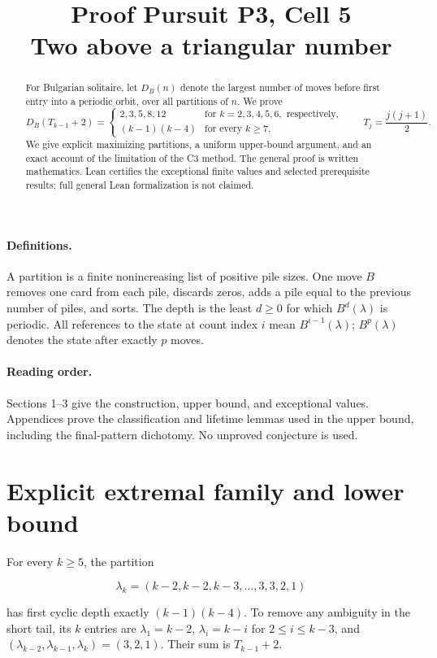 \documentclass[11pt,a4paper]{article}
\title{Proof Pursuit P3, Cell 5\\Two above a triangular number}
\author{}
\date{}
\begin{document}
\maketitle
\begin{abstract}
For Bulgarian solitaire, let $D_B(n)$ denote the largest number of moves before first entry into a periodic orbit, over all partitions of $n$. We prove
\[
D_B(T_{k-1}+2)=
\begin{cases}
2,3,5,8,12 & \text{for } k=2,3,4,5,6,\text{ respectively},\\
(k-1)(k-4) & \text{for every }k\ge7,
\end{cases}
\qquad T_j=\frac{j(j+1)}2.
\]
We give explicit maximizing partitions, a uniform upper-bound argument, and an exact account of the limitation of the C3 method. The general proof is written mathematics. Lean certifies the exceptional finite values and selected prerequisite results; full general Lean formalization is not claimed.
\end{abstract}
\paragraph{Definitions.} A partition is a finite nonincreasing list of positive pile sizes. One move $B$ removes one card from each pile, discards zeros, adds a pile equal to the previous number of piles, and sorts. The depth is the least $d\ge0$ for which $B^d(\lambda)$ is periodic. All references to the state at count index $i$ mean $B^{i-1}(\lambda)$; $B^p(\lambda)$ denotes the state after exactly $p$ moves.
\paragraph{Reading order.} Sections 1--3 give the construction, upper bound, and exceptional values. Appendices prove the classification and lifetime lemmas used in the upper bound, including the final-pattern dichotomy. No unproved conjecture is used.
\tableofcontents
\section{Explicit extremal family and lower bound}

For every $k\ge5$, the partition

\[
\lambda_k=(k-2,k-2,k-3,\ldots,3,3,2,1)
\]

has first cyclic depth exactly $(k-1)(k-4)$. To remove any ambiguity in the short tail, its $k$ entries are $\lambda_1=k-2$, $\lambda_i=k-i$ for $2\le i\le k-3$, and $(\lambda_{k-2},\lambda_{k-1},\lambda_k)=(3,2,1)$. Their sum is $T_{k-1}+2$.
\end{document}
